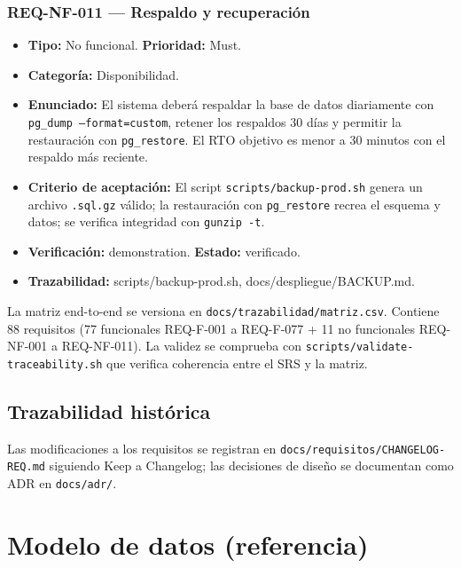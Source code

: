 \documentclass[12pt,a4paper]{article}
\begin{document}
\subsubsection{REQ-NF-011 --- Respaldo y recuperación}
\begin{itemize}
  \item \textbf{Tipo:} No funcional. \textbf{Prioridad:} Must.
  \item \textbf{Categoría:} Disponibilidad.
  \item \textbf{Enunciado:} El sistema deberá respaldar la base de datos diariamente con \texttt{pg\_dump --format=custom}, retener los respaldos 30 días y permitir la restauración con \texttt{pg\_restore}. El RTO objetivo es menor a 30 minutos con el respaldo más reciente.
  \item \textbf{Criterio de aceptación:} El script \texttt{scripts/backup-prod.sh} genera un archivo \texttt{.sql.gz} válido; la restauración con \texttt{pg\_restore} recrea el esquema y datos; se verifica integridad con \texttt{gunzip -t}.
  \item \textbf{Verificación:} demonstration. \textbf{Estado:} verificado.
  \item \textbf{Trazabilidad:} scripts/backup-prod.sh, docs/despliegue/BACKUP.md.
\end{itemize}

\clearpage
\label{sec:trazabilidad}

La matriz end-to-end se versiona en \texttt{docs/trazabilidad/matriz.csv}. Contiene 88 requisitos (77 funcionales REQ-F-001 a REQ-F-077 + 11 no funcionales REQ-NF-001 a REQ-NF-011). La validez se comprueba con \texttt{scripts/validate-traceability.sh} que verifica coherencia entre el SRS y la matriz.

\subsection{Trazabilidad histórica}
Las modificaciones a los requisitos se registran en \texttt{docs/requisitos/CHANGELOG-REQ.md} siguiendo Keep a Changelog; las decisiones de diseño se documentan como ADR en \texttt{docs/adr/}.

\clearpage

\section{Modelo de datos (referencia)}
\label{sec:modelo-datos}
\end{document}
